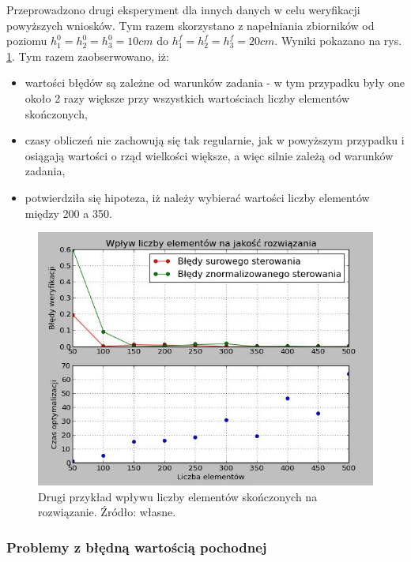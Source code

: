 Przeprowadzono drugi eksperyment dla innych danych w celu weryfikacji powyższych wniosków. Tym razem skorzystano z napełniania zbiorników od poziomu $h_{1}^{0} = h_{2}^{0} = h_{3}^{0} = 10 cm$ do $h_{1}^{f} = h_{2}^{f} = h_{3}^{f} = 20 cm$. Wyniki pokazano na rys. \ref{fig:elementsinfluence10-2050-500}. Tym razem zaobserwowano, iż:
\begin{itemize}
    \item wartości błędów są zależne od warunków zadania - w tym przypadku były one około 2 razy większe przy wszystkich wartościach liczby elementów skończonych,
    \item czasy obliczeń nie zachowują się tak regularnie, jak w powyższym przypadku i osiągają wartości o rząd wielkości większe, a więc silnie zależą od warunków zadania,
    \item potwierdziła się hipoteza, iż należy wybierać wartości liczby elementów między 200 a 350.
\end{itemize}

\begin{figure}[ht]
    \centering
    \includegraphics{Grafika/elements_influence_10-20_50-500}
    \caption{Drugi przykład wpływu liczby elementów skończonych na rozwiązanie. Źródło: własne.}
    \label{fig:elementsinfluence10-2050-500}
\end{figure}

\subsubsection{Problemy z błędną wartością pochodnej}

